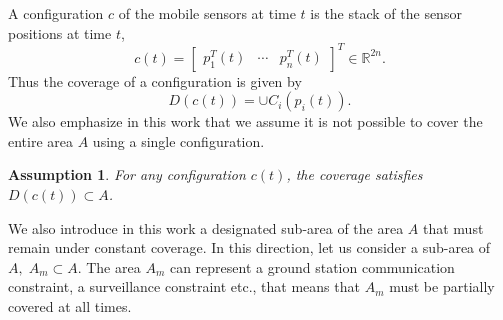 \documentclass{iacas}
\newcommand{\bmat}[1]{\begin{bmatrix}#1\end{bmatrix}}
\newtheorem{assumption}{Assumption}
\begin{document}
A configuration $c$ of the mobile sensors at time $t$ is the stack of the sensor positions at time $t$,
\begin{equation}
c\left(t\right) = \bmat{
p_{1}^{T}\left(t\right)&\cdots&p_{n}^{T}\left(t\right)}^{T}\in\mathbb{R}^{2n}.
\label{eq:configuration definition}
\end{equation}
Thus the coverage of a configuration is given by
\begin{equation*}
D\left( c\left( t \right) \right) = \cup C_i(p_i(t)).
\end{equation*}
We also emphasize in this work that we assume it is not possible to cover the entire area $A$ using a single configuration.
\begin{assumption}
For any configuration $c(t)$, the coverage satisfies $D\left( c\left( t \right) \right) \subset A$. %
\label{assump: no full coverage}
\end{assumption}

We also introduce in this work a designated sub-area of the area $A$ that must remain under constant coverage.  In this direction, let us consider a sub-area of $A,\; A_m \subset A$. The area $A_m$ can represent a ground station communication constraint, a surveillance constraint etc., that means that $A_m$ must be partially covered at all times.
\end{document}
